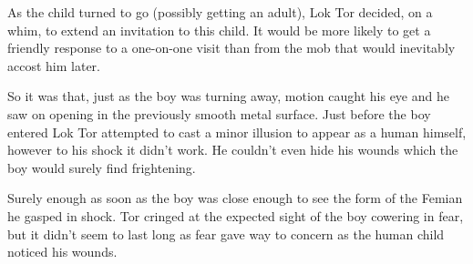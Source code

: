 As the child turned to go (possibly getting an adult), Lok Tor decided, on a
whim, to extend an invitation to this child. It would be more likely to get a
friendly response to a one-on-one visit than from the mob that would inevitably
accost him later.

So it was that, just as the boy was turning away, motion caught his eye and he
saw on opening in the previously smooth metal surface. Just before the boy
entered Lok Tor attempted to cast a minor illusion to appear as a human
himself, however to his shock it didn't work. He couldn't even hide his wounds
which the boy would surely find frightening.

Surely enough as soon as the boy was close enough to see the form of the Femian
he gasped in shock. Tor cringed at the expected sight of the boy cowering in fear, but
it didn't seem to last long as fear gave way to concern as the human child noticed
his wounds.

